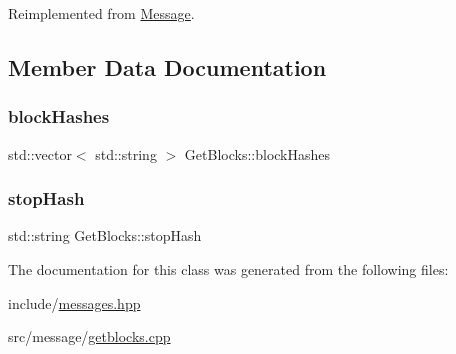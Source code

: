 Reimplemented from \mbox{\hyperlink{classMessage_a6f8e3ac2eed3a8afe9400fcd5b3447b2}{Message}}.



\subsection{Member Data Documentation}
\mbox{\label{classGetBlocks_a24b217db1c15cdfcd91fbebf2b10238a}} 
\subsubsection{\texorpdfstring{block\+Hashes}{blockHashes}}
{\footnotesize\ttfamily std\+::vector$<$ std\+::string $>$ Get\+Blocks\+::block\+Hashes\hspace{0.3cm}{\ttfamily [private]}}

\mbox{\label{classGetBlocks_a7b367127191d3855f593dc7b96188853}} 
\subsubsection{\texorpdfstring{stop\+Hash}{stopHash}}
{\footnotesize\ttfamily std\+::string Get\+Blocks\+::stop\+Hash\hspace{0.3cm}{\ttfamily [private]}}



The documentation for this class was generated from the following files\+:\begin{DoxyCompactItemize}
\item 
include/\mbox{\hyperlink{messages_8hpp}{messages.\+hpp}}\item 
src/message/\mbox{\hyperlink{getblocks_8cpp}{getblocks.\+cpp}}\end{DoxyCompactItemize}
